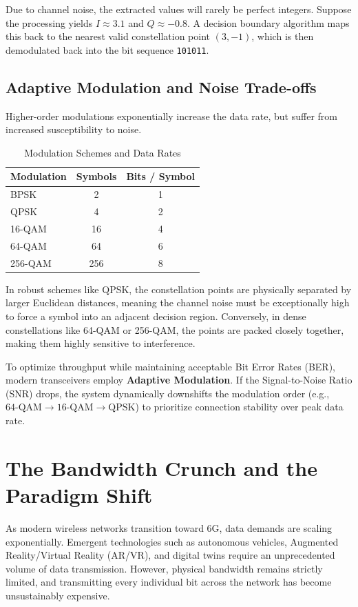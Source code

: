 \documentclass[10pt, conference]{IEEEtran}
\begin{document}
Due to channel noise, the extracted values will rarely be perfect integers. Suppose the processing yields $I \approx 3.1$ and $Q \approx -0.8$. A decision boundary algorithm maps this back to the nearest valid constellation point $(3, -1)$, which is then demodulated back into the bit sequence \texttt{101011}.

\subsection{\textbf{Adaptive Modulation and Noise Trade-offs}}
Higher-order modulations exponentially increase the data rate, but suffer from increased susceptibility to noise.

\begin{table}[h]
\centering
\caption{Modulation Schemes and Data Rates}
\begin{tabular}{lcc}
\toprule
\textbf{Modulation} & \textbf{Symbols} & \textbf{Bits / Symbol} \\
\midrule
BPSK  & 2   & 1 \\
QPSK  & 4   & 2 \\
16-QAM & 16  & 4 \\
64-QAM & 64  & 6 \\
256-QAM & 256 & 8 \\
\bottomrule
\end{tabular}
\end{table}

In robust schemes like QPSK, the constellation points are physically separated by larger Euclidean distances, meaning the channel noise must be exceptionally high to force a symbol into an adjacent decision region. Conversely, in dense constellations like 64-QAM or 256-QAM, the points are packed closely together, making them highly sensitive to interference.

To optimize throughput while maintaining acceptable Bit Error Rates (BER), modern transceivers employ \textbf{Adaptive Modulation}. If the Signal-to-Noise Ratio (SNR) drops, the system dynamically downshifts the modulation order (e.g., $64\text{-QAM} \to 16\text{-QAM} \to \text{QPSK}$) to prioritize connection stability over peak data rate.


\section{\large \textbf{The Bandwidth Crunch and the Paradigm Shift}}
As modern wireless networks transition toward 6G, data demands are scaling exponentially. Emergent technologies such as autonomous vehicles, Augmented Reality/Virtual Reality (AR/VR), and digital twins require an unprecedented volume of data transmission. However, physical bandwidth remains strictly limited, and transmitting every individual bit across the network has become unsustainably expensive.
\end{document}
